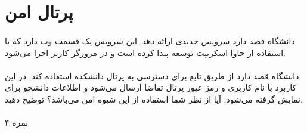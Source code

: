 \documentclass[../main.tex]{subfiles}
\begin{document}
\section{پرتال امن}

\paragraph{}
دانشگاه قصد دارد سرویس جدیدی ارائه دهد.
این سرویس یک قسمت وب دارد که با استفاده از جاوا اسکریپت توسعه پیدا
کرده است و در مرورگر کاربر اجرا می‌شود.

\paragraph{}
دانشگاه قصد دارد از طریق تابع  برای دسترسی به پرتال دانشکده استفاده کند.
در این کاربرد با نام کاربری و رمز عبور پرتال تقاضا ارسال می‌شود و اطلاعات دانشجو برای نمایش گرفته می‌شود.
آیا از نظر شما استفاده از این شیوه امن می‌باشد؟
توضیح دهید.

\paragraph{}
۴ نمره
\end{document}
